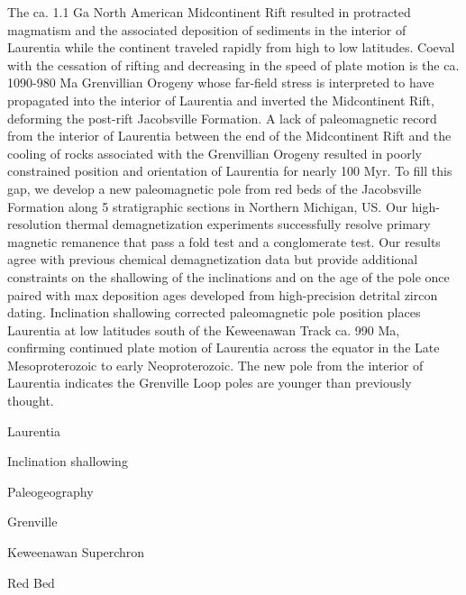 \documentclass[draft]{agujournal2019}
\begin{document}
The ca. 1.1 Ga North American Midcontinent Rift resulted in protracted magmatism and the associated deposition of sediments in the interior of Laurentia while the continent traveled rapidly from high to low latitudes. Coeval with the cessation of rifting and decreasing in the speed of plate motion is the ca. 1090-980 Ma Grenvillian Orogeny whose far-field stress is interpreted to have propagated into the interior of Laurentia and inverted the Midcontinent Rift, deforming the post-rift Jacobsville Formation. A lack of paleomagnetic record from the interior of Laurentia between the end of the Midcontinent Rift and the cooling of rocks associated with the Grenvillian Orogeny resulted in poorly constrained position and orientation of Laurentia for nearly 100 Myr. To fill this gap, we develop a new paleomagnetic pole from red beds of the Jacobsville Formation along 5 stratigraphic sections in Northern Michigan, US. Our high-resolution thermal demagnetization experiments successfully resolve primary magnetic remanence that pass a fold test and a conglomerate test. Our results agree with previous chemical demagnetization data but provide additional constraints on the shallowing of the inclinations and on the age of the pole once paired with max deposition ages developed from high-precision detrital zircon dating. Inclination shallowing corrected paleomagnetic pole position places Laurentia at low latitudes south of the Keweenawan Track ca. 990 Ma, confirming continued plate motion of Laurentia across the equator in the Late Mesoproterozoic to early Neoproterozoic. The new pole from the interior of Laurentia indicates the Grenville Loop poles are younger than previously thought.

\begin{keypoints}
\item Laurentia  
\item Inclination shallowing  
\item Paleogeography  
\item Grenville  
\item Keweenawan Superchron  
\item Red Bed 
\end{keypoints}
\end{document}
